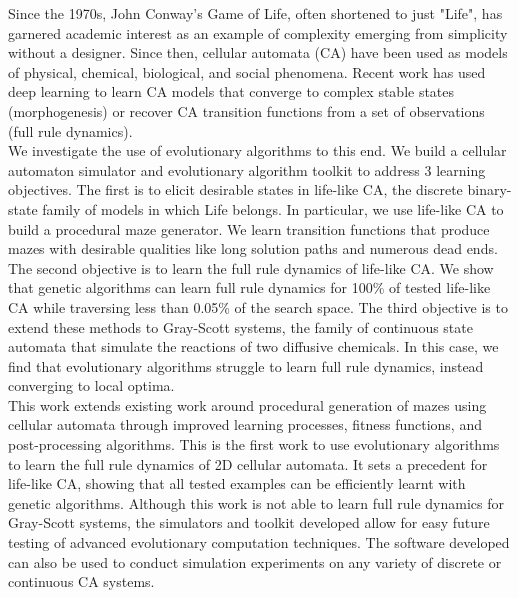 
Since the 1970s, John Conway's Game of Life, often shortened to just "Life", has garnered academic interest as an example of complexity emerging from simplicity without a designer. Since then, cellular automata (CA) have been used as models of physical\cite{wolf2004lattice}, chemical\cite{gray1983autocatalytic}, biological\cite{deutsch2021bio}, and social phenomena\cite{white2000high}. Recent work has used deep learning to learn CA models that converge to complex stable states (morphogenesis)\cite{mordvintsev2020growing} or recover CA transition functions from a set of observations (full rule dynamics)\cite{wulff1992learning}.\\

We investigate the use of evolutionary algorithms to this end. We build a cellular automaton simulator and evolutionary algorithm toolkit to address 3 learning objectives. The first is to elicit desirable states in life-like CA, the discrete binary-state family of models in which Life belongs. In particular, we use life-like CA to build a procedural maze generator. We learn transition functions that produce mazes with desirable qualities like long solution paths and numerous dead ends. The second objective is to learn the full rule dynamics of life-like CA. We show that genetic algorithms can learn full rule dynamics for 100\% of tested life-like CA while traversing less than 0.05\% of the search space. The third objective is to extend these methods to Gray-Scott systems, the family of continuous state automata that simulate the reactions of two diffusive chemicals. In this case, we find that evolutionary algorithms struggle to learn full rule dynamics, instead converging to local optima.\\

This work extends existing work around procedural generation of mazes using cellular automata\cite{adams2017procedural} through improved learning processes, fitness functions, and post-processing algorithms. This is the first work to use evolutionary algorithms to learn the full rule dynamics of 2D cellular automata. It sets a precedent for life-like CA, showing that all tested examples can be efficiently learnt with genetic algorithms. Although this work is not able to learn full rule dynamics for Gray-Scott systems, the simulators and toolkit developed allow for easy future testing of advanced evolutionary computation techniques. The software developed can also be used to conduct simulation experiments on any variety of discrete or continuous CA systems.\\